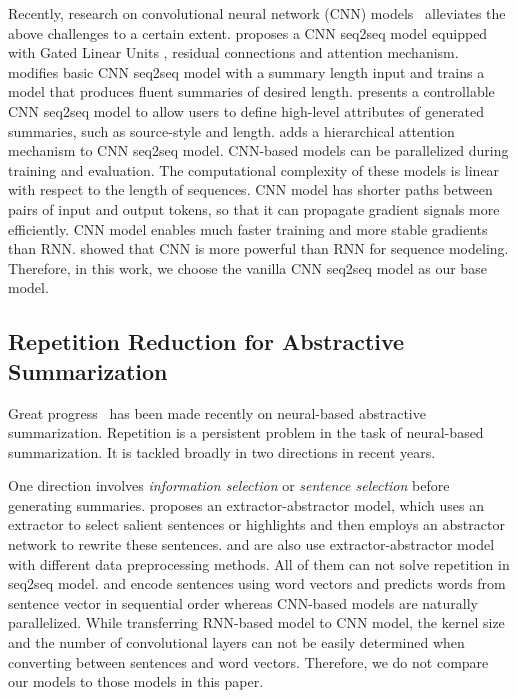 Recently, research on convolutional neural network (CNN) 
models~\citep{gehring2017convs2s,FanGA18,LiuLZ18,Zhang2019AbstractTS} alleviates 
the above challenges to a certain extent. 
\cite{gehring2017convs2s} proposes a CNN seq2seq model equipped with
Gated Linear Units \citep{DauphinFAG17}, residual connections \citep{HeZRS16}
and attention mechanism. 
\cite{LiuLZ18} modifies basic CNN seq2seq model with a summary length
input and trains a model that produces fluent summaries of desired length.
\cite{FanGA18} presents a controllable CNN seq2seq model to
allow users to define high-level attributes of generated
summaries, such as source-style and length.
\cite{Zhang2019AbstractTS} adds a hierarchical attention mechanism to CNN seq2seq model.
CNN-based models can be parallelized during
training and evaluation. The computational complexity of
these models is linear with respect to the length of sequences.
CNN model has shorter paths between pairs of input and
output tokens, so that it can propagate gradient signals more
efficiently.
CNN model enables much faster training and more stable gradients 
than RNN. 
\cite{bai2018empirical} showed that CNN is more powerful than 
RNN for sequence modeling.
Therefore, in this work, we choose the vanilla CNN seq2seq model as 
our base model.

\subsection{Repetition Reduction for Abstractive Summarization}
Great progress~
\citep{RushCW15,ChopraAR16,NallapatiZSGX16,SeeLM17,PaulusXS17,HardyV18,KourisAS19,LiuL19,ZhangWZ19,WangQW19}
has been made recently on
neural-based abstractive summarization.
Repetition is a persistent problem in the task of 
neural-based summarization. 
It is tackled broadly in two directions in recent years. 

One direction involves {\em information selection} or 
{\em sentence selection} before generating summaries.
\cite{P18-1063} proposes an extractor-abstractor model, which uses an extractor  
to select salient sentences or highlights and then employs 
an abstractor network to rewrite these sentences.
\cite{SharmaHHW19} and \cite{SanghwanB19} are also use extractor-abstractor model 
with different data preprocessing methods.
All of them can not solve repetition in seq2seq model.
\cite{TanWX17} and \cite{D18-1205,D18-1441} encode
sentences using word vectors
and predicts words from sentence vector in sequential order 
whereas CNN-based models are naturally parallelized. 
While transferring RNN-based model to CNN model, 
the kernel size and the number of 
convolutional layers can not be easily determined when
converting between sentences and word vectors. 
Therefore, we do not compare our models to those models in this paper. 

